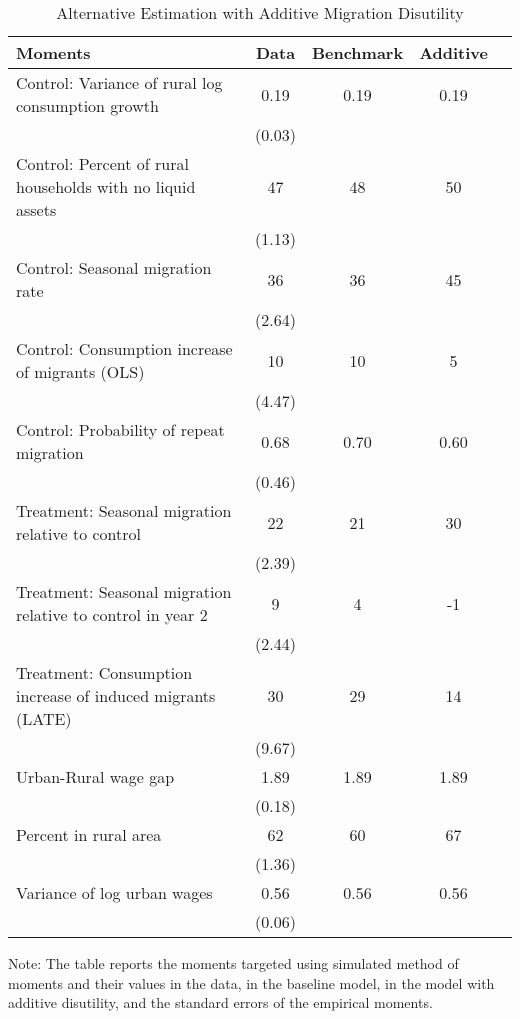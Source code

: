 \documentclass[12pt,pdftex]{article}
\renewcommand{\arraystretch}{1.1}
\begin{document}
\begin{onehalfspacing}
\begin{table}[t]
\small
\setlength {\tabcolsep}{1.5mm}
\renewcommand{\arraystretch}{1.2}
\begin{center}
\caption{Alternative Estimation with Additive Migration Disutility}
\vspace{0.3cm}
\begin{tabular}{l c c c c}
\hline
\hline
Moments & Data & Benchmark & Additive\\
\hline
Control: Variance of rural log consumption growth & 0.19 & 0.19 & 0.19  \\
 & \footnotesize{(0.03)} & \\
Control: Percent of rural households with no liquid assets & \phantom{0.}47 & \phantom{0.}48 & \phantom{0.}50  \\
 & \footnotesize{(1.13)} & \\
Control: Seasonal migration rate & \phantom{0.}36& \phantom{0.}36& \phantom{0.}45  \\
 & \footnotesize{(2.64)} & \\
Control: Consumption increase of migrants (OLS) & \phantom{0.}10 & \phantom{0.}10& \phantom{0.}5  \\
 & \footnotesize{(4.47)} & \\
 Control: Probability of repeat migration &       0.68   &  0.70 &  0.60      \\
            & \footnotesize{(0.46)} & \\
Treatment: Seasonal migration relative to control & \phantom{0.}22& \phantom{0.}21& \phantom{0.}30  \\
 & \footnotesize{(2.39)} & \\
Treatment: Seasonal migration relative to control in year 2 & \phantom{0.}9 & \phantom{0.}4& -1  \\
 & \footnotesize{(2.44)} & \\
Treatment: Consumption increase of induced migrants (LATE)  & \phantom{0.}30 & \phantom{0.}29& \phantom{0.}14\\
 & (9.67) & \\
\hline
Urban-Rural wage gap & 1.89  & 1.89 & 1.89  \\
 & \footnotesize{(0.18)} & \\
Percent in rural area & \phantom{0.}62 & \phantom{0.}60 & 67  \\
 & \footnotesize{(1.36)} & \\
Variance of log urban wages  & 0.56 &  0.56 & 0.56         \\
 & \footnotesize{(0.06)} & \\
\hline
\hline
\end{tabular}
\parbox[c]{6.25in}{%
{\footnotesize  \vspace{0.3cm} Note: The table reports the moments targeted using simulated method of moments and their values in the data, in the baseline model, in the model with additive disutility, and the standard errors of the empirical moments.}
}
\end{center}
\end{table}


\end{onehalfspacing}
\end{document}
